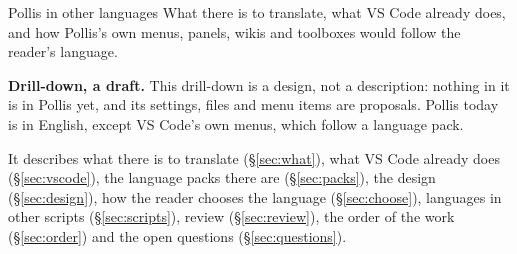 

\usepackage{titlesec}
\usepackage{tabularx}
\usepackage{booktabs}
\usepackage{longtable}
\usepackage{needspace}

\fancyhf{}
\fancyfoot[R]{\footnotesize\color{soft}\thepage}

\titleformat{\section}{\color{navy}\large\bfseries}{\color{deepamber}\thesection}{0.6em}{}
\titleformat{\subsection}{\color{navy}\normalsize\bfseries}{\color{deepamber}\thesubsection}{0.5em}{}
\titlespacing*{\section}{0pt}{12pt}{4pt}
\titlespacing*{\subsection}{0pt}{8pt}{2pt}
\setlength{\parskip}{4pt}

\usepackage{xurl}
\newcommand{\file}[1]{{\small\nolinkurl{#1}}}
\newcommand{\ui}[1]{\textbf{#1}}
\newcommand{\code}[1]{\texttt{\small #1}}



  {Pollis in other languages}
  {What there is to translate, what VS Code already does, and how Pollis's own menus, panels, wikis and toolboxes
   would follow the reader's language.}

\begin{nbox}
{\color{amber}\bfseries Drill-down, a draft.}\enspace
This drill-down is a design, not a description: nothing in it is in Pollis yet, and its settings, files and menu
items are proposals. Pollis today is in English, except VS Code's own menus, which follow a language pack.

It describes what there is to translate (\S\ref{sec:what}), what VS Code already does (\S\ref{sec:vscode}), the
language packs there are (\S\ref{sec:packs}), the design (\S\ref{sec:design}), how the reader chooses the language
(\S\ref{sec:choose}), languages in other scripts (\S\ref{sec:scripts}), review (\S\ref{sec:review}), the order of the
work (\S\ref{sec:order}) and the open questions (\S\ref{sec:questions}).
\end{nbox}

